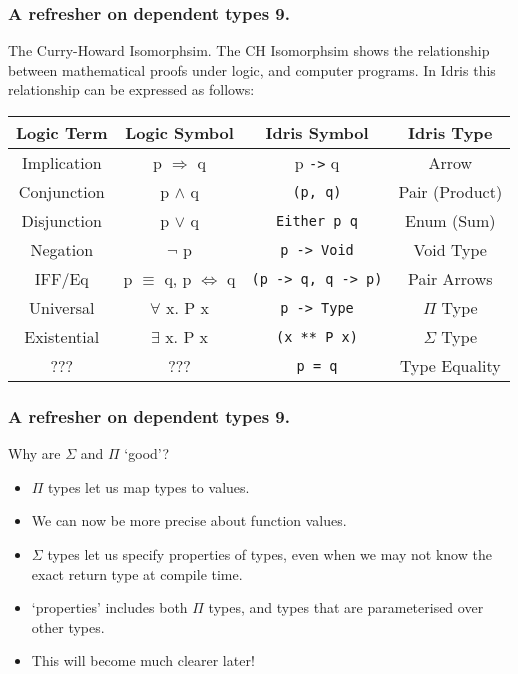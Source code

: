 \documentclass{beamer}
\begin{document}
\begin{frame}[fragile]
  \frametitle{A refresher on dependent types 9.}
  \begin{block}{The Curry-Howard Isomorphsim.}
  The CH Isomorphsim shows the relationship between mathematical
    proofs under logic, and computer programs. In Idris this
    relationship can be expressed as follows:
  \begin{table}[h!]
    \begin{tabular}{c|c|c|c}
    \textbf{Logic Term} & \textbf{Logic Symbol} & \textbf{Idris Symbol}
      & \textbf{Idris Type} \\
    \hline
      Implication & p $\Rightarrow$ q & p \texttt{->} q
      & Arrow \\
      Conjunction & p $\land$ q & \texttt{(p, q)} 
      & Pair (Product) \\
      Disjunction & p $\lor$ q & \texttt{Either p q}
      & Enum (Sum)\\
      Negation & $\lnot$ p & \texttt{p -> Void} &
      Void Type \\
      IFF/Eq & p $\equiv$ q, p $\iff$ q & \texttt{(p -> q, q -> p)}
      & Pair Arrows \\
      Universal & $\forall$ x. P x & 
      \texttt{p -> Type} & $\Pi$ Type \\
      Existential & $\exists$ x. P x
      & \texttt{(x ** P x)} & $\Sigma$ Type \\
      \hline
      ??? & ??? & \texttt{p = q} & Type Equality
    \end{tabular}
    
  \end{table}
  \end{block}
\end{frame}

\begin{frame}[fragile]
  \frametitle{A refresher on dependent types 9.}
  \begin{block}{Why are $\Sigma$ and $\Pi$ `good'?}
  \begin{itemize}
    \item $\Pi$ types let us map types to values.
    \item We can now be more precise about function values.
    \item $\Sigma$ types let us specify properties of types, even
      when we may not know the exact return type at compile time.
    \item `properties' includes both $\Pi$ types, and types that are
      parameterised over other types.
    \item This will become much clearer later!
  \end{itemize}
  \end{block}
\end{frame}
\end{document}
